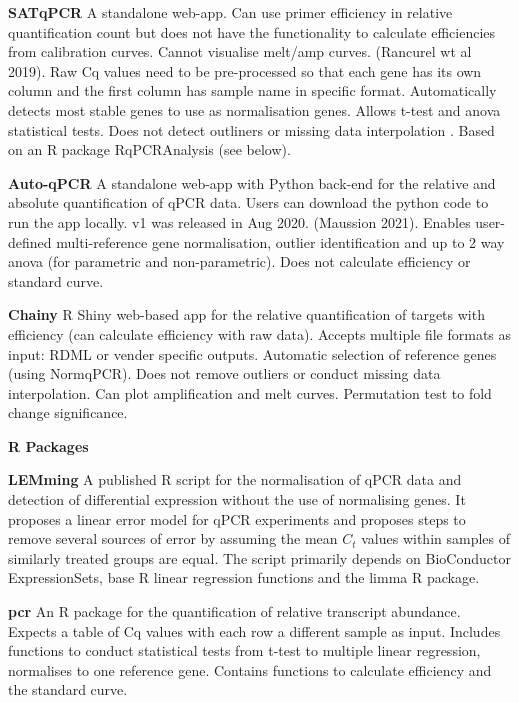 \documentclass{SBCbookchapter}
\begin{document}
\textbf{SATqPCR} A standalone web-app. Can use primer efficiency in relative quantification count but does not have the functionality to calculate efficiencies from calibration curves. Cannot visualise melt/amp curves. (Rancurel wt al 2019). Raw Cq values need to be pre-processed so that each gene has its own column and the first column has sample name in specific format. Automatically detects most stable genes to use as normalisation genes. Allows t-test and anova statistical tests. Does not detect outliners or missing data interpolation \cite{Rancurel2019}. Based on an R package RqPCRAnalysis (see below).

\textbf{Auto-qPCR} A standalone web-app with Python back-end for the relative and absolute quantification of qPCR data. Users can download the python code to run the app locally. v1 was released in Aug 2020. (Maussion 2021). Enables user-defined multi-reference gene normalisation, outlier identification and up to 2 way anova (for parametric and non-parametric). Does not calculate efficiency or standard curve. \cite{Maussion2021}

\textbf{Chainy} R Shiny web-based app for the relative quantification of targets with efficiency (can calculate efficiency with raw data). Accepts multiple file formats as input: RDML or vender specific outputs. Automatic selection of reference genes (using NormqPCR). Does not remove outliers or conduct missing data interpolation. Can plot amplification and melt curves. Permutation test to fold change significance. \cite{Mallona2017}

\textbf{R Packages}

\textbf{LEMming} A published R script for the normalisation of qPCR data and detection of differential expression without the use of normalising genes. It proposes a linear error model for qPCR experiments and proposes steps to remove several sources of error by assuming the mean $C_t$ values within samples of similarly treated groups are equal. The script primarily depends on BioConductor ExpressionSets, base R linear regression functions and the limma R package. \cite{Feuer2015}

\textbf{pcr} An R package for the quantification of relative transcript abundance. Expects a table of Cq values with each row a different sample as input. Includes functions to conduct statistical tests from t-test to multiple linear regression, normalises to one reference gene. Contains functions to calculate efficiency and the standard curve. \cite{Ahmed2018}
\end{document}
